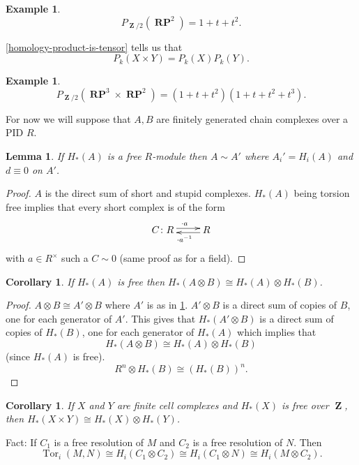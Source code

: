 \documentclass[10pt,]{book}
\theoremstyle{plain}
\newtheorem{corollary}[theorem]{Corollary}
\newtheorem{lemma}[theorem]{Lemma}
\theoremstyle{definition}
\newtheorem{example}[theorem]{Example}
\numberwithin{equation}{section}
\DeclareMathOperator{\Tor}{Tor}
\DeclareMathOperator{\ZZ}{\mathbf{Z}}
\DeclareMathOperator{\RP}{\mathbf{RP}}
\begin{document}
\begin{example}\label{example-24}
\[P_{\ZZ/2} (\RP^2) = 1 + t + t^2.\]\end{example}
\par
\ref{homology-product-is-tensor} tells us that \[P_k(X\times Y) = P_k(X)P_k(Y).\]%
\begin{example}\label{example-25}
\[P_{\ZZ/2}(\RP^3 \times \RP^2) = (1+t+t^2)(1+t+t^2+t^3).\]\end{example}
\par
For now we will suppose that \(A,B\) are finitely generated chain complexes over a PID \(R\).%
\begin{lemma}\label{free-homology-homotopic-zero-boundary}
If \(H_*(A)\) is a free \(R\)-module then \(A\sim A'\) where \(A_i' = H_i(A)\) and \(d\equiv 0\) on \(A'\).
          \end{lemma}
\begin{proof}
\(A\) is the direct sum of short and stupid complexes. \(H_*(A)\) being torsion free implies that every short complex is of the form
            \[
              \xymatrix{ C\colon R\ar@<.5ex>[r]^{\cdot a} & R \ar@<.5ex>[l]^{\cdot a^{-1}}}
            \]
            with \(a\in R^\times\) such a \(C \sim 0\) (same proof as for a field).
          \end{proof}
\begin{corollary}\label{corollary-8}
If \(H_*(A)\) is free then \(H_*(A\otimes B) \cong H_*(A) \otimes H_*(B)\).\end{corollary}
\begin{proof}
\(A\otimes B \cong A' \otimes B\) where \(A'\) is as in \ref{free-homology-homotopic-zero-boundary}.
            \(A'\otimes B\) is a direct sum of copies of \(B\), one for each generator of \(A'\).
            This gives that \(H_*(A'\otimes B)\) is  a direct sum of copies of \(H_*(B)\), one for each generator of \(H_*(A)\) which implies that
            \[H_*(A\otimes B) \cong H_*(A) \otimes H_*(B)\]
            (since \(H_*(A)\) is free).
            \[R^n \otimes H_*(B) \cong (H_*(B))^n.\]\end{proof}
\begin{corollary}\label{corollary-9}
If \(X\) and \(Y\) are finite cell complexes and \(H_*(X)\) is free over \(\ZZ\), then \(H_*(X\times Y) \cong H_*(X) \otimes H_*(Y)\).\end{corollary}
\par
Fact: If \(C_1\) is a free resolution of \(M\) and \(C_2\) is a free resolution of \(N\).
          Then
          \[\Tor_i(M,N) \cong H_i(C_1 \otimes C_2) \cong H_i(C_1 \otimes N) \cong H_i(M\otimes C_2).\]
\end{document}
